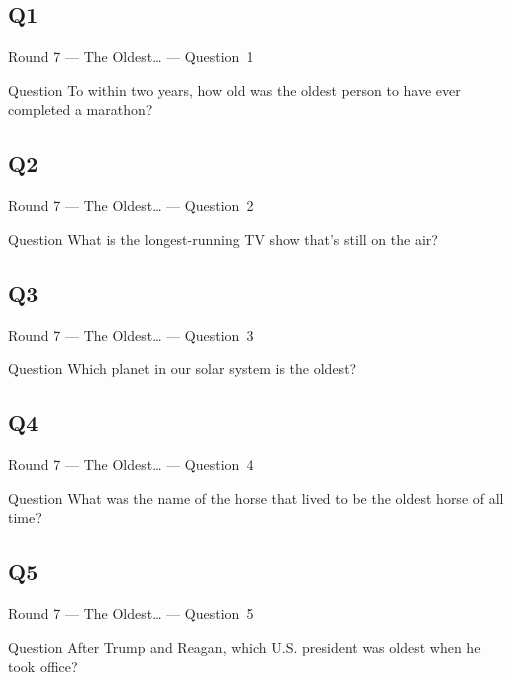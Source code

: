 \documentclass[11pt]{beamer}
\begin{document}
\subsection*{Q1}
\begin{frame}[t]{Round 7 --- The Oldest… --- \mbox{Question 1}}
\vspace{-0.5em}
\begin{block}{Question}
To within two years, how old was the oldest person to have ever completed a marathon?
\end{block}
\end{frame}
\subsection*{Q2}
\begin{frame}[t]{Round 7 --- The Oldest… --- \mbox{Question 2}}
\vspace{-0.5em}
\begin{block}{Question}
What is the longest-running TV show that's still on the air?
\end{block}
\end{frame}
\subsection*{Q3}
\begin{frame}[t]{Round 7 --- The Oldest… --- \mbox{Question 3}}
\vspace{-0.5em}
\begin{block}{Question}
Which planet in our solar system is the oldest?
\end{block}
\end{frame}
\subsection*{Q4}
\begin{frame}[t]{Round 7 --- The Oldest… --- \mbox{Question 4}}
\vspace{-0.5em}
\begin{block}{Question}
What was the name of the horse that lived to be the oldest horse of all time?
\end{block}
\end{frame}
\subsection*{Q5}
\begin{frame}[t]{Round 7 --- The Oldest… --- \mbox{Question 5}}
\vspace{-0.5em}
\begin{block}{Question}
After Trump and Reagan, which U.S. president was oldest when he took office?
\end{block}
\end{frame}
\end{document}
